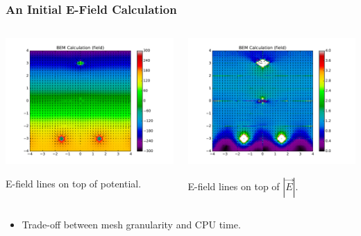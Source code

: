 \documentclass[xcolor=dvipsnames]{beamer}
\begin{document}
\begin{frame}
  \frametitle{An Initial E-Field Calculation}
  \begin{columns}
    \begin{column}{0.5\textwidth}
      \begin{center}
        \includegraphics[height=0.6\textheight]{uboone-drift-field-pot-tight.pdf}

        \scriptsize E-field lines on top of potential.
      \end{center}
    \end{column}
    \begin{column}{0.5\textwidth}
      \begin{center}
        \includegraphics[height=0.6\textheight]{uboone-drift-field-tight.pdf}

        \scriptsize E-field lines on top of $\left|\vec{E}\right|$.
      \end{center}
    \end{column}
  \end{columns}
  
  \begin{itemize}
  \item Trade-off between mesh granularity and CPU time.
  \end{itemize}
\end{frame}
\end{document}
